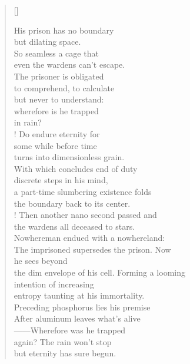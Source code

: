 \documentclass{book}
\begin{document}
\begin{verse}[\versewidth]

    His prison has no boundary\\
    but dilating space.\\
    So seamless a cage that\\
    even the wardens can't escape.\\
    The prisoner is obligated\\
    to comprehend, to calculate\\
    but never to understand:\\
    wherefore is he trapped\\
    in rain?\\!
    Do endure eternity for\\
    some while before time\\
    turns into dimensionless grain.\\
    With which concludes end of duty\\
    discrete steps in his mind,\\
    a part-time slumbering existence folds\\
    the boundary back to its center.\\!
    Then another nano second passed and\\
    the wardens all deceased to stars.\\
    Nowhereman endued with a nowhereland:\\
    The imprisoned supersedes the prison. Now\\
    he sees beyond\\
    the dim envelope of his cell. Forming a looming\\
    intention of increasing\\
    entropy taunting at his immortality.\\
    Preceding phosphorus lies his premise\\
    After aluminum leaves what's alive\\
    ——Wherefore was he trapped\\
    again? The rain won't stop\\
    but eternity has sure begun.
\end{verse}
\end{document}
